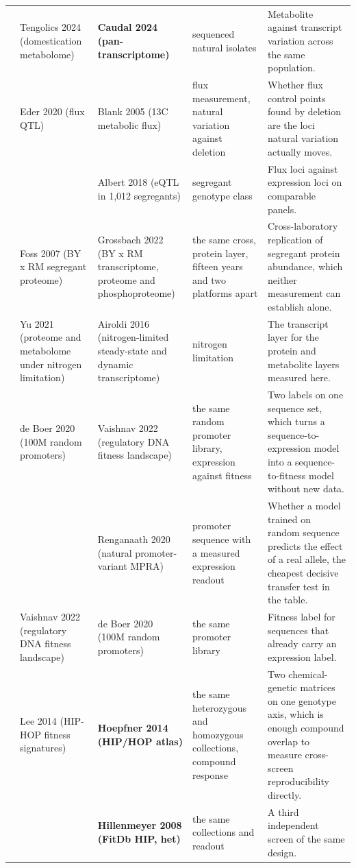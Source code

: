 \begin{landscape}
\begin{longtable}{@{}r@{\hspace{4pt}} L{42mm} L{44mm} L{48mm} L{96mm}@{}}
 & Tengolics 2024 (domestication metabolome) & \textbf{Caudal 2024 (pan-transcriptome)} & sequenced natural isolates & Metabolite against transcript variation across the same population. \\
 & Eder 2020 (flux QTL) & Blank 2005 (13C metabolic flux) & flux measurement, natural variation against deletion & Whether flux control points found by deletion are the loci natural variation actually moves. \\
 &  & Albert 2018 (eQTL in 1,012 segregants) & segregant genotype class & Flux loci against expression loci on comparable panels. \\
 & Foss 2007 (BY x RM segregant proteome) & Grossbach 2022 (BY x RM transcriptome, proteome and phosphoproteome) & the same cross, protein layer, fifteen years and two platforms apart & Cross-laboratory replication of segregant protein abundance, which neither measurement can establish alone. \\
 & Yu 2021 (proteome and metabolome under nitrogen limitation) & Airoldi 2016 (nitrogen-limited steady-state and dynamic transcriptome) & nitrogen limitation & The transcript layer for the protein and metabolite layers measured here. \\
 & de Boer 2020 (100M random promoters) & Vaishnav 2022 (regulatory DNA fitness landscape) & the same random promoter library, expression against fitness & Two labels on one sequence set, which turns a sequence-to-expression model into a sequence-to-fitness model without new data. \\
 &  & Renganaath 2020 (natural promoter-variant MPRA) & promoter sequence with a measured expression readout & Whether a model trained on random sequence predicts the effect of a real allele, the cheapest decisive transfer test in the table. \\
 & Vaishnav 2022 (regulatory DNA fitness landscape) & de Boer 2020 (100M random promoters) & the same promoter library & Fitness label for sequences that already carry an expression label. \\
 & Lee 2014 (HIP-HOP fitness signatures) & \textbf{Hoepfner 2014 (HIP/HOP atlas)} & the same heterozygous and homozygous collections, compound response & Two chemical-genetic matrices on one genotype axis, which is enough compound overlap to measure cross-screen reproducibility directly. \\
 &  & \textbf{Hillenmeyer 2008 (FitDb HIP, het)} & the same collections and readout & A third independent screen of the same design. \\

\end{longtable}
\end{landscape}
